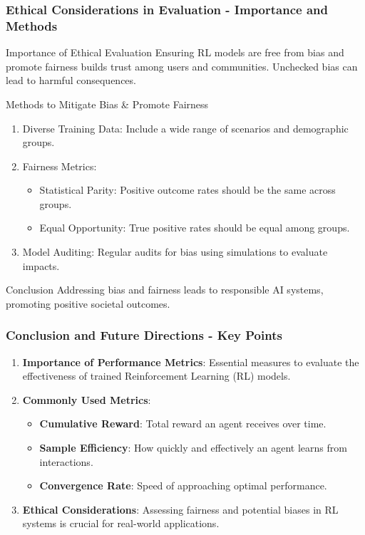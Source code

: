 \documentclass{beamer}
\begin{document}
\begin{frame}[fragile]
    \frametitle{Ethical Considerations in Evaluation - Importance and Methods}
    \begin{block}{Importance of Ethical Evaluation}
        Ensuring RL models are free from bias and promote fairness builds trust among users and communities. Unchecked bias can lead to harmful consequences.
    \end{block}

    \begin{block}{Methods to Mitigate Bias \& Promote Fairness}
        \begin{enumerate}
            \item Diverse Training Data: Include a wide range of scenarios and demographic groups.
            \item Fairness Metrics:
            \begin{itemize}
                \item Statistical Parity: Positive outcome rates should be the same across groups.
                \item Equal Opportunity: True positive rates should be equal among groups.
            \end{itemize}
            \item Model Auditing: Regular audits for bias using simulations to evaluate impacts.
        \end{enumerate}
    \end{block}
    
    \begin{block}{Conclusion}
        Addressing bias and fairness leads to responsible AI systems, promoting positive societal outcomes.
    \end{block}
\end{frame}

\begin{frame}[fragile]
    \frametitle{Conclusion and Future Directions - Key Points}
    \begin{enumerate}
        \item \textbf{Importance of Performance Metrics}: Essential measures to evaluate the effectiveness of trained Reinforcement Learning (RL) models.
        \item \textbf{Commonly Used Metrics}:
        \begin{itemize}
            \item \textbf{Cumulative Reward}: Total reward an agent receives over time.
            \item \textbf{Sample Efficiency}: How quickly and effectively an agent learns from interactions.
            \item \textbf{Convergence Rate}: Speed of approaching optimal performance.
        \end{itemize}
        \item \textbf{Ethical Considerations}: Assessing fairness and potential biases in RL systems is crucial for real-world applications.
    \end{enumerate}
\end{frame}
\end{document}
